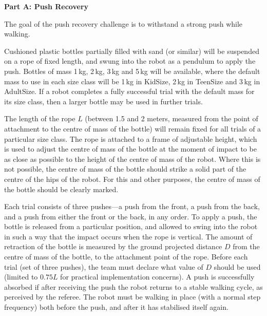 \clearpage
\sffamily
{\bfseries\color[rgb]{0.4,0.4,0.4}
Part A: Push Recovery }
{}


\bigskip

The goal of the push recovery challenge is to withstand a strong push while walking. 

Cushioned plastic bottles partially filled with sand (or similar) will be suspended on a rope of fixed length, and swung into the robot as a pendulum to apply the push. Bottles of mass 1$\,$kg, 2$\,$kg, 3$\,$kg and 5$\,$kg will be available, where the default mass to use in each size class will be 1$\,$kg in KidSize, 2$\,$kg in TeenSize and 3$\,$kg in AdultSize. If a robot completes a fully successful trial with the default mass for its size class, then a larger bottle may be used in further trials.

\medskip
The length of the rope $L$ (between 1.5 and 2 meters, measured from the point of 
attachment to the centre of mass of the bottle) will remain fixed for all trials 
of a particular size class.
The rope is attached to a frame of adjustable height,
which is used to adjust the centre of mass of the bottle at the moment of impact
to be as close as possible to the height of the centre of mass of the robot.
Where this is not possible, the centre of mass of the bottle should strike a solid part
of the centre of the hips of the robot.
For this and other purposes, the centre of mass of the bottle should be clearly marked.

\medskip
Each trial consists of three pushes---a push from the front, a push from the back, and a push from either the front or the back, in any order. To apply a push, the bottle is released from a particular position, and allowed to swing into the robot in such a way that the impact occurs when the rope is vertical. The amount of retraction of the bottle is measured by the ground projected distance $D$ from the centre of mass of the bottle, to the attachment point of the rope. Before each trial (set of three pushes), the team must declare what value of $D$ should be used (limited to $0.75L$ for practical implementation concerns). A push is successfully absorbed if after receiving the push the robot 
returns to a stable walking cycle, as perceived by the referee. The robot must be walking in place (with a normal step frequency) both before the push, and after it has stabilised itself again.

